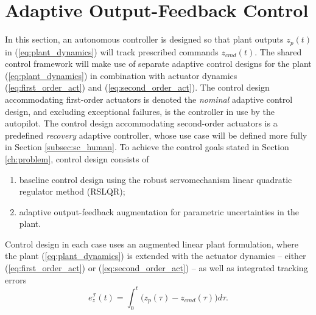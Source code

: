 \section{Adaptive Output-Feedback Control}\label{subsec:sc_adaptive}
In this section, an autonomous controller is designed so that plant outputs $z_p(t)$ in (\ref{eq:plant_dynamics}) will track prescribed commands $z_{cmd}(t)$. The shared control framework will make use of separate adaptive control designs for the plant (\ref{eq:plant_dynamics}) in combination with actuator dynamics (\ref{eq:first_order_act}) and (\ref{eq:second_order_act}). The control design accommodating first-order actuators is denoted the \textit{nominal} adaptive control design, and excluding exceptional failures, is the controller in use by the autopilot. The control design accommodating second-order actuators is a predefined \textit{recovery} adaptive controller, whose use case will be defined more fully in Section \ref{subsec:sc_human}. To achieve the control goals stated in Section \ref{ch:problem}, control design consists of
\begin{enumerate}[label=(\roman*)]
	\item baseline control design using the robust servomechanism linear quadratic regulator method (RSLQR);
	\item adaptive output-feedback augmentation for parametric uncertainties in the plant.
\end{enumerate}

Control design in each case uses an augmented linear plant formulation, where the plant (\ref{eq:plant_dynamics}) is extended with the actuator dynamics -- either (\ref{eq:first_order_act}) or (\ref{eq:second_order_act}) -- as well as integrated tracking errors 
\begin{equation}
	e_z^{\mathcal{I}}(t) = \int_0^{t} \big( z_p(\tau) - z_{cmd}(\tau)\big) d\tau.
\end{equation}

